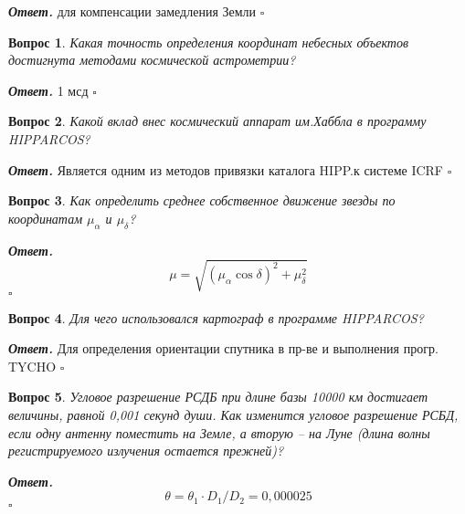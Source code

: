 \documentclass[12pt]{article}
\newtheorem{problem}{Вопрос}
\newenvironment{solution}[1][\it{Ответ}]{\textbf{#1. } }{$\square$}
\begin{document}
		\begin{solution}
			для
			компенсации замедления Земли
		\end{solution}
		
		\begin{problem}
			 Какая точность определения
			координат небесных объектов
			достигнута методами космической
			астрометрии?
		\end{problem}
		
		\begin{solution}
			1 мсд
		\end{solution}
		
		\begin{problem}
			Какой вклад внес космический
			аппарат им.Хаббла в программу
			HIPPARCOS? 
		\end{problem}
		
		\begin{solution}
			Является одним из методов
			привязки каталога HIPP.к системе ICRF
		\end{solution}
		
		\begin{problem}
			Как определить среднее собственное
			движение звезды по координатам $\mu_\alpha$ и $\mu_\delta$?
		\end{problem}
		
		\begin{solution}
			$$\mu = \sqrt{ (\mu_\alpha\cos\delta)^2+\mu_\delta^2}$$
		\end{solution}
		
		\begin{problem}
			 Для чего использовался картограф в
			программе HIPPARCOS? 
		\end{problem}
		
		\begin{solution}
			Для
			определения ориентации спутника в пр-ве
			и выполнения прогр. TYCHO
		\end{solution}
		
		\begin{problem}
			Угловое разрешение РСДБ при длине
			базы 10000 км достигает величины,
			равной 0,001 секунд души. Как изменится
			угловое разрешение РСБД, если одну
			антенну поместить на Земле, а вторую –
			на Луне
			(длина волны регистрируемого излучения
			остается прежней)?
		\end{problem}
		
		\begin{solution}
			$$\theta= \theta_1\cdot D_1/D_2=0,000025$$
		\end{solution}
		
\end{document}
